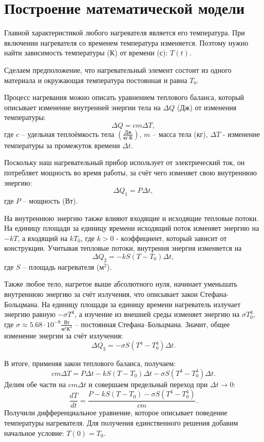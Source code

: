 \section{Построение математической модели}
    Главной характеристикой любого нагревателя является его температура. При включении нагревателя со временем температура изменяется. Поэтому нужно найти зависимость температуры (К) от времени (с): $ T(t) $.

    Сделаем предположение, что нагревательный элемент состоит из одного материала и окружающая температура постоянная и равна $T_0$.%
    
    Процесс нагревания можно описать уравнением теплового баланса, который описывает изменение внутренней энергии тела на $ \Delta Q $ (Дж) от изменения температуры:
    \[
        \Delta Q = cm \Delta T,
    \]
    где $c$ -- удельная теплоёмкость тела $\left(\frac{\text{Дж}}{\text{кг} \cdot \text{К}}\right)$, $m$ -- масса тела (кг), $ \Delta T $ - изменение температуры за промежуток времени $\Delta t$.

    Поскольку наш нагревательный прибор использует от электрический ток, он потребляет мощность во время работы, за счёт чего изменяет свою внутреннюю энергию:
    \[
        \Delta Q_1 = P \Delta t,
    \]
    где $P$ -- мощность (Вт). 

    На внутреннюю энергию также влияют входящие и исходящие тепловые потоки. На единицу площади за единицу времени исходящий поток изменяет энергию на $ -k T $, а входящий на $ k T_0 $, где $ k > 0$ - коэффициент, который зависит от конструкции. Учитывая тепловые потоки, внутрення энергия изменяется на
    \[
        \Delta Q_2 = -k S (T - T_0) \Delta t,
    \]
    где $S$ -- площадь нагревателя ($\text{м}^2$).

    Также любое тело, нагретое выше абсолютного нуля, начинает уменьшать внутреннюю энергию за счёт излучения, что описывает закон Стефана-Больцмана. На единицу площади за единицу времени нагреватель излучает энергию равную $ -\sigma T^4 $, а изучение из внешней среды изменяет энергию на $ \sigma T_0^4 $, где $\sigma \approx 5.68 \cdot 10^{-8} \frac{\text{Вт}}{\text{м}^2 \text{К}^4}$ -- постоянная Стефана--Больцмана. Значит, общее изменение энергии за счёт излучения:
    \[
        \Delta Q_3 = -\sigma S (T^4 - T_0^4) \Delta t.
    \]


    В итоге, применяя закон теплового баланса, получаем:
    \[
        cm\Delta T = P \Delta t - k S (T - T_0) \Delta t - \sigma S (T^4 - T_0^4) \Delta t.
    \]
    Делим обе части на $ cm \Delta t $ и совершаем предельный переход при $ \Delta t \to 0 $:
    \[
        \frac{dT}{dt} = \frac{ P - k S (T - T_0) - \sigma S (T^4 - T_0^4) }{cm}.
    \]
    Получили дифференциальное уравнение, которое описывает поведение температуры нагревателя. Для получения единственного решения добавим начальное условие: \( T(0) = T_0 \).

